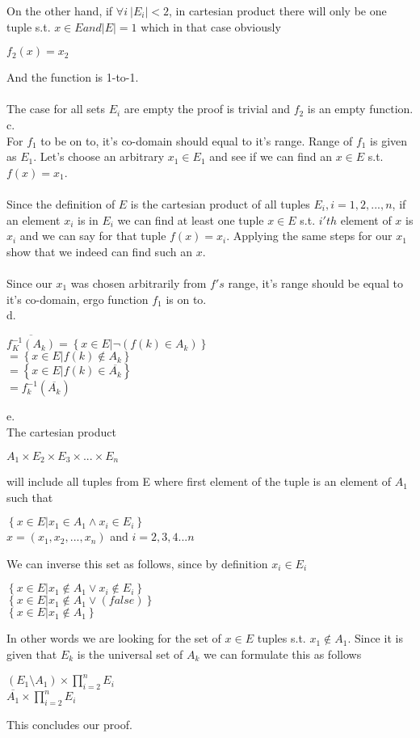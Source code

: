 \documentclass[12pt]{article}
\begin{document}
On the other hand, if $\forall i\: |E_i|<2$, in cartesian product there will only be one tuple s.t. $x\in E and |E|=1$ which in that case obviously
\begin{center}
$f_2(x)=x_2$
\end{center}
And the function is 1-to-1.\\\\
The case for all sets $E_i$ are empty the proof is trivial and $f_2$ is an empty function.\\
c.\\
For $f_1$ to be on to, it's co-domain should equal to it's range. Range of $f_1$ is given as $E_1$. Let's choose an arbitrary $x_1\in E_1$ and see if we can find an $x\in E$ s.t. $f(x)=x_1$.\\\\
Since the definition of $E$ is the cartesian product of all tuples $E_i, i=1,2,...,n$, if an element $x_i$ is in $E_i$ we can find at least one tuple $x\in E$ s.t. $i'th$ element of $x$ is $x_i$ and we can say for that tuple $f(x)=x_i$. Applying the same steps for our $x_1$ show that we indeed can find such an $x$.\\\\
Since our $x_1$ was chosen arbitrarily from $f's$ range, it's range should be equal to it's co-domain, ergo function $f_1$ is on to.\\
d.\\
\begin{center}
$\overline{f_K^{-1}(A_k)}=\left\{{x\in E|\neg (f(k)\in A_k )}\right\} $\\
$=\left\{{x\in E|f(k)\not \in A_k}\right\}$\\
$=\left\{{x\in E|f(k)\in \overline{A_k}}\right\}$\\
$=f_k^{-1}(\overline{A_k})$
\end{center}
e.\\The cartesian product
\begin{center}
$A_1\times E_2\times E_3\times ...\times E_n$
\end{center}
will include all tuples from E where first element of the tuple is an element of $A_1$ such that
\begin{center}
$\left\{{ x \in E| x_1\in A_1 \wedge x_i\in E_i}\right\}$\\
$x=(x_1,x_2,...,x_n)$ and $i=2,3,4...n$
\end{center}
We can inverse this set as follows, since by definition $x_i\in E_i$
\begin{center}
$\left\{{ x \in E| x_1\notin A_1 \vee x_i\notin E_i}\right\}$\\
$\left\{{ x \in E| x_1\notin A_1 \vee (false)}\right\}$\\
$\left\{{x\in E| x_1\notin A_1}\right\}$
\end{center}
In other words we are looking for the set of $x\in E$ tuples s.t. $x_1\notin A_1$. Since it is given that $E_k$ is the universal set of $A_k$ we can formulate this as follows
\begin{center}
$(E_1\setminus A_1)\times \prod\limits_{i=2}^n E_i$\\
$\overline{A_1}\times \prod\limits_{i=2}^n E_i$
\end{center}
This concludes our proof.
\end{document}
